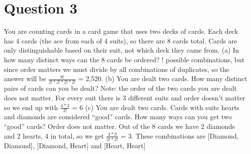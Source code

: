 \documentclass[12pt]{report}
\begin{document}
\section{Question 3}
You are counting cards in a card game that uses two decks of cards. Each deck has 4 cards (the ace from each of 4 suits), so there are 8 cards total. Cards are only distinguishable based on their suit, not which deck they came from.
\newline
\nelwine
(a) In how many distinct ways can the 8 cards be ordered?
! possible combinations, but since order matters we must divide by all combinations of duplicates, so the answer will be $\frac{8!}{2!*2!*2!*2!}$ = 2,520.
\newline
\newline
(b) You are dealt two cards. How many distinct pairs of cards can you be dealt? Note: the order of the two cards you are dealt does not matter.
\newline
For every suit there is 3 different suits and order doesn't matter so we end up with $\frac{4*3}{2!}$ = 6
\newline
\newline
(c) You are dealt two cards.  Cards with suits hearts and diamonds are considered “good” cards. How many ways can you get two “good” cards? Order does not matter.
\newline
Out of the 8 cards we have 2 diamonds and 2 hearts, 4 in total, so we get $\frac{4*3}{2!*2!}$ = 3. These combinations are [Diamond, Diamond], [Diamond, Heart] and [Heart, Heart]
\end{document}
